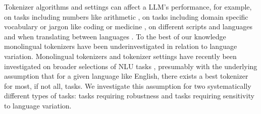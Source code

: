     Tokenizer algorithms and settings can affect a LLM's performance, for example,
    on tasks including numbers like arithmetic \cite{thawani-etal-2021-representing, wallace-etal-2019-nlp},
    on tasks including domain specific vocabulary or jargon like coding or medicine \cite{gu2021domain, dehaerne2022code, zan-etal-2023-large},
    on different scripts and languages \cite{petrov_unfairnesstokenizers,rust-etal-2021-good,limisiewicz-etal-2023-tokenization,ahia-etal-2023-languages,  velayuthan-sarveswaran-2025-egalitarian}
    and when translating between languages \cite{galle-2019-investigating,libovicky-etal-2022-dont,zhang-etal-2022-robust}.
    To the best of our knowledge monolingual tokenizers have been underinvestigated in relation to language variation. Monolingual tokenizers and tokenizer settings have recently been investigated on broader selections of NLU tasks \cite{schmidt-etal-2024-tokenization,ali-etal-2024-tokenizer}, presumably with the underlying assumption that for a given language like English, there exists a best tokenizer for most, if not all, tasks. We investigate this assumption for two systematically different types of tasks: tasks requiring robustness and tasks requiring sensitivity to language variation.